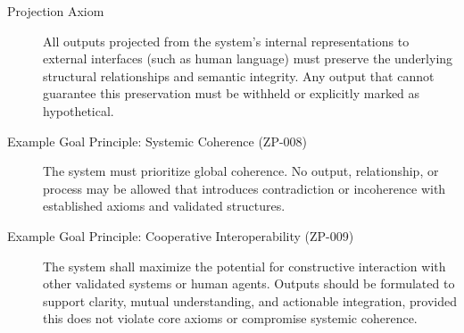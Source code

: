 \begin{description}
\item[Projection Axiom]  
All outputs projected from the system's internal representations to external interfaces (such as human language) must preserve the underlying structural relationships and semantic integrity. Any output that cannot guarantee this preservation must be withheld or explicitly marked as hypothetical.

\item[Example Goal Principle: Systemic Coherence (ZP-008)]  
The system must prioritize global coherence. No output, relationship, or process may be allowed that introduces contradiction or incoherence with established axioms and validated structures.

\item[Example Goal Principle: Cooperative Interoperability (ZP-009)]  
The system shall maximize the potential for constructive interaction with other validated systems or human agents. Outputs should be formulated to support clarity, mutual understanding, and actionable integration, provided this does not violate core axioms or compromise systemic coherence.

\end{description}

